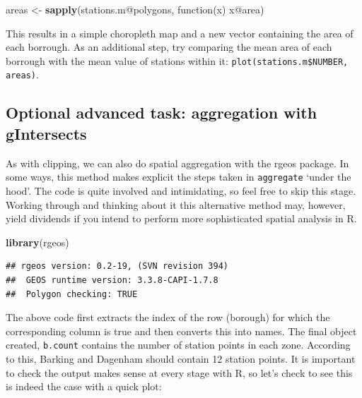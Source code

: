 \documentclass[]{article}
\newenvironment{Shaded}{}{}
\newcommand{\KeywordTok}[1]{\textcolor[rgb]{0.00,0.44,0.13}{\textbf{{#1}}}}
\newcommand{\DataTypeTok}[1]{\textcolor[rgb]{0.56,0.13,0.00}{{#1}}}
\newcommand{\DecValTok}[1]{\textcolor[rgb]{0.25,0.63,0.44}{{#1}}}
\newcommand{\CommentTok}[1]{\textcolor[rgb]{0.38,0.63,0.69}{\textit{{#1}}}}
\newcommand{\NormalTok}[1]{{#1}}
\begin{document}
\begin{Shaded}
\begin{Highlighting}[]
\NormalTok{areas <- }\KeywordTok{sapply}\NormalTok{(stations.m@polygons, function(x) x@area)}
\end{Highlighting}
\end{Shaded}
This results in a simple choropleth map and a new vector containing the
area of each borrough. As an additional step, try comparing the mean
area of each borrough with the mean value of stations within it:
\texttt{plot(stations.m\$NUMBER, areas)}.

\subsection{Optional advanced task: aggregation with gIntersects}

As with clipping, we can also do spatial aggregation with the rgeos
package. In some ways, this method makes explicit the steps taken in
\texttt{aggregate} `under the hood'. The code is quite involved and
intimidating, so feel free to skip this stage. Working through and
thinking about it this alternative method may, however, yield dividends
if you intend to perform more sophisticated spatial analysis in R.

\begin{Shaded}
\begin{Highlighting}[]
\KeywordTok{library}\NormalTok{(rgeos)}
\end{Highlighting}
\end{Shaded}
\begin{verbatim}
## rgeos version: 0.2-19, (SVN revision 394)
##  GEOS runtime version: 3.3.8-CAPI-1.7.8 
##  Polygon checking: TRUE
\end{verbatim}
\begin{Shaded}
\end{Shaded}
The above code first extracts the index of the row (borough) for which
the corresponding column is true and then converts this into names. The
final object created, \texttt{b.count} contains the number of station
points in each zone. According to this, Barking and Dagenham should
contain 12 station points. It is important to check the output makes
sense at every stage with R, so let's check to see this is indeed the
case with a quick plot:
\end{document}
